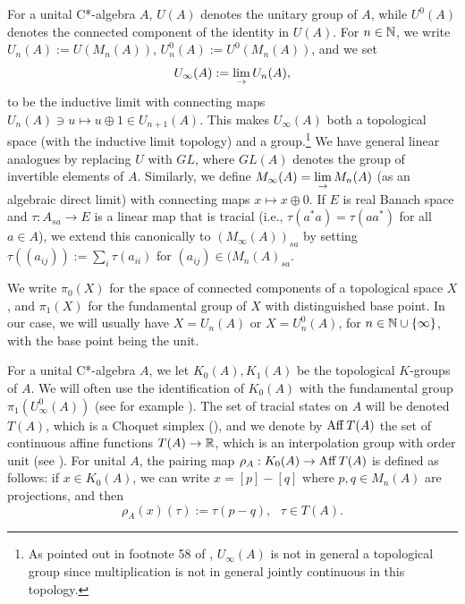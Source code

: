 \documentclass[12pt]{amsart}
\begin{document}
For a unital C*-algebra $A$, $U(A)$ denotes the unitary group of $A$, while $U^0(A)$ denotes the connected component of the identity in $U(A)$. For $n \in \mathbb{N}$, we write $U_n(A) := U(M_n(A))$, $U_n^0(A) := U^0(M_n(A))$, and we set
\begin{equation} U_{\infty}(A) := \underset{\to}{\lim}\, U_n(A), \end{equation}
to be the inductive limit with connecting maps $U_n(A) \ni u \mapsto u \oplus 1 \in U_{n+1}(A)$. 
This makes $U_\infty(A)$ both a topological space (with the inductive limit topology) and a group.\footnote{As pointed out in footnote 58 of \cite{CGSTW23}, $U_{\infty}(A)$ is not in general a topological group since multiplication is not in general jointly continuous in this topology.}
We have general linear analogues by replacing $U$ with $GL$, where $GL(A)$ denotes the group of invertible elements of $A$. 
Similarly, we define $M_{\infty}(A) = \underset{\to}{\lim} \, M_n(A)$ (as an algebraic direct limit) with connecting maps $x \mapsto x \oplus 0$. If $E$ is real Banach space and $\tau: A_{sa} \to E$ is a linear map that is tracial (i.e., $\tau(a^*a) = \tau(aa^*)$ for all $a \in A$), we extend this canonically to $(M_{\infty}(A))_{sa}$ by setting $\tau((a_{ij})) := \sum_i \tau(a_{ii})$ for $(a_{ij})\in (M_n(A)_{sa}$. 

We write $\pi_0(X)$ for the space of connected components of a topological space $X$, and $\pi_1(X)$ for the fundamental group of $X$ with distinguished base point. In our case, we will usually have $X = U_n(A)$ or $X = U_n^0(A)$, for $n \in \mathbb{N} \cup \{\infty\}$, with the base point being the unit. 

For a unital C*-algebra $A$, we let $K_0(A),K_1(A)$ be the topological $K$-groups of $A$. 
We will often use the identification of $K_0(A)$ with the fundamental group $\pi_1(U_{\infty}^0(A))$ (see for example \cite[Chapter 11.4]{RordamKBook}).
The set of tracial states on $A$ will be denoted $T(A)$, which is a Choquet simplex (\cite[Theorem 3.1.18]{Sakaibook}), and we denote by $\operatorname{Aff} T(A)$ the set of continuous affine functions $T(A) \to \mathbb{R}$, which is an interpolation group with order unit (see \cite[Chapter 11]{Goodearlbook}).
For unital $A$, the pairing map $\rho_A: K_0(A) \to \operatorname{Aff} T(A)$ is defined as follows: if $x \in K_0(A)$, we can write $x = [p] - [q]$ where $p,q \in M_n(A)$ are projections, and then
\begin{equation}
\rho_A(x)(\tau) := \tau (p - q), \ \ \ \tau \in T(A).
\end{equation}
\end{document}
